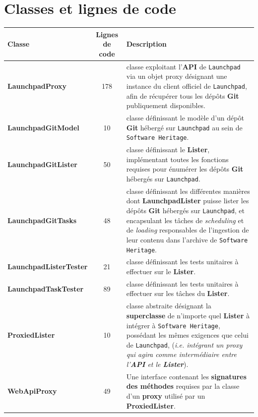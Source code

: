 \documentclass[12pt,a4paper]{report}
\begin{document}
\section{Classes et lignes de code}
\begin{table}
  \centering
  \begin{tabular}{|l|c|p{6cm}|}
    \hline
    \textbf{Classe} & \textbf{Lignes de code} & \textbf{Description}\\
    \hline
    \textbf{LaunchpadProxy} & 178 & classe exploitant l'\textbf{API} de \texttt{Launchpad} via un objet proxy désignant une instance du client officiel de \texttt{Launchpad}, afin de récupérer tous les dépôts \textbf{Git} publiquement disponibles.\\
    \hline
    \textbf{LaunchpadGitModel} & 10 & classe définissant le modèle d'un dépôt \textbf{Git} hébergé sur \texttt{Launchpad} au sein de \texttt{Software Heritage}.\\
    \hline
    \textbf{LaunchpadGitLister} & 50 & classe définissant le \textbf{Lister}, implémentant toutes les fonctions requises pour énumérer les dépôts \textbf{Git} hébergés sur \texttt{Launchpad}.\\
    \hline
    \textbf{LaunchpadGitTasks} & 48 & classe définissant les différentes manières dont \textbf{LaunchpadLister} puisse lister les dépôts \textbf{Git} hébergés sur \texttt{Launchpad}, et encapsulant les tâches de \textit{scheduling} et de \textit{loading} responsables de l'ingestion de leur contenu dans l'archive de \texttt{Software Heritage}.\\
    \hline
    \textbf{LaunchpadListerTester} & 21 & classe définissant les tests unitaires à effectuer sur le \textbf{Lister}.\\
    \hline
    \textbf{LaunchpadTaskTester} & 89 & classe définissant les tests unitaires à effectuer sur les tâches du \textbf{Lister}.\\
    \hline
    \textbf{ProxiedLister} & 10 & classe abstraite désignant la \textbf{superclasse} de n'importe quel \textbf{Lister} à intégrer à \texttt{Software Heritage}, possédant les mêmes exigences que celui de \texttt{Launchpad}, (\textit{i.e. intégrant un proxy qui agira comme intermédiaire entre l'\textbf{API} et le \textbf{Lister}}).\\
    \hline
    \textbf{WebApiProxy} & 49 & Une interface contenant les \textbf{signatures des méthodes} requises par la classe d'un \textbf{proxy} utilisé par un \textbf{ProxiedLister}.\\
    \hline
  \end{tabular}
\end{table}
\end{document}
